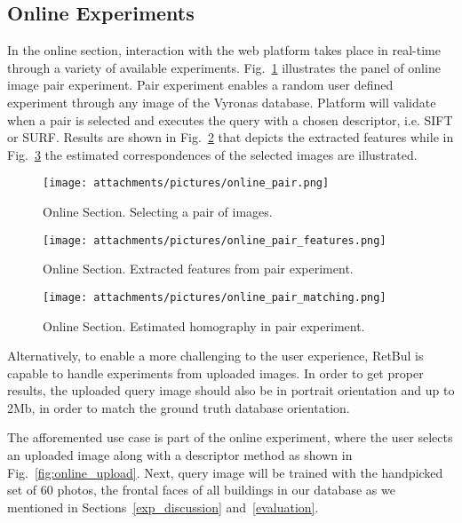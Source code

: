 \subsection{Online Experiments}\label{online}

In the online section, interaction with the web platform takes place in real-time through a variety of available experiments.
Fig.~\ref{fig:online_pair} illustrates the panel of online image pair experiment.
Pair experiment enables a random user defined experiment through any image of the Vyronas database.
Platform will validate when a pair is selected and executes the query with a chosen descriptor, i.e. SIFT or SURF. 
Results are shown in Fig.~\ref{fig:online_pair_features} that depicts the extracted features while in Fig.~\ref{fig:online_pair_matching} the estimated correspondences of the selected images are illustrated.



\begin{figure}[htp!]
  \centering
  \texttt{[image: attachments/pictures/online\_pair.png]}
  \caption{Online Section. Selecting a pair of images.}
  \label{fig:online_pair}
\end{figure} 

\newpage

\begin{figure}[htp!]
  \centering
  \texttt{[image: attachments/pictures/online\_pair\_features.png]}
  \caption{Online Section. Extracted features from pair experiment.}
  \label{fig:online_pair_features}
\end{figure} 

\begin{figure}[ht!]
  \centering
  \texttt{[image: attachments/pictures/online\_pair\_matching.png]}
  \caption{Online Section. Estimated homography in pair experiment.}
  \label{fig:online_pair_matching}
\end{figure} 

Alternatively, to enable a more challenging to the user experience, RetBul is capable to handle
experiments from uploaded images.
In order to get proper results, the uploaded query image should also be in portrait orientation and up to 2Mb, in order to match the ground truth database orientation.

The afforemented use case is part of the online experiment, where the user selects an uploaded image along with a descriptor method as shown in Fig.~\ref{fig:online_upload}.
Next, query image will be trained with the handpicked set of $60$ photos, the  
frontal faces of all buildings in our database as we mentioned in Sections~\ref{exp_discussion} and~\ref{evaluation}.

